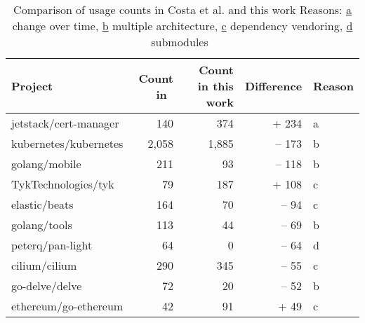 \begin{table}[h]
    \centering
    \caption[Comparison of \unsafe{} usage counts Costa et al. and this work]%
    {Comparison of \unsafe{} usage counts in Costa et al. and this work \newline \footnotesize
    Reasons: \underline{a} change over time, \underline{b} multiple architecture, \underline{c} dependency vendoring,
    \underline{d} submodules~\newline}
    \label{tbl:costa-counts-comparison}
    \begin{tabular}{l|r|r|r|l}
        \toprule
        Project & Count in~\cite{costa2020} & Count in this work & Difference & Reason \\
        \midrule
        jetstack/cert-manager  &   140 &   374 &  + 234 & a \\
        kubernetes/kubernetes  & 2,058 & 1,885 & -- 173 & b \\
        golang/mobile          &   211 &    93 & -- 118 & b \\
        TykTechnologies/tyk    &    79 &   187 &  + 108 & c \\
        elastic/beats          &   164 &    70 &  -- 94 & c \\
        golang/tools           &   113 &    44 &  -- 69 & b \\
        peterq/pan-light       &    64 &     0 &  -- 64 & d \\
        cilium/cilium          &   290 &   345 &  -- 55 & c \\
        go-delve/delve         &    72 &    20 &  -- 52 & b \\
        ethereum/go-ethereum   &    42 &    91 &   + 49 & c \\
        \bottomrule
    \end{tabular}
\end{table}